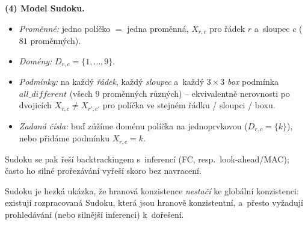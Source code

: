 \begin{priklad}
\textbf{(4) Model Sudoku.}
\begin{itemize}
  \item \emph{Proměnné:} jedno políčko $=$ jedna proměnná, $X_{r,c}$ pro řádek $r$ a~sloupec $c$ ($81$ proměnných).
  \item \emph{Domény:} $D_{r,c}=\{1,\dots,9\}$.
  \item \emph{Podmínky:} na každý \emph{řádek}, každý \emph{sloupec} a~každý $3\times 3$ \emph{box} podmínka $\mathit{all\_different}$ (všech $9$ proměnných různých) -- ekvivalentně nerovnosti po dvojicích $X_{r,c}\neq X_{r',c'}$ pro políčka ve stejném řádku / sloupci / boxu.
  \item \emph{Zadaná čísla:} buď zúžíme doménu políčka na jednoprvkovou ($D_{r,c}=\{k\}$), nebo přidáme podmínku $X_{r,c}=k$.
\end{itemize}
Sudoku se pak řeší backtrackingem s~inferencí (FC, resp.\ look-ahead/MAC); často ho silné prořezávání vyřeší skoro bez navracení.
\begin{poznamka}
Sudoku je hezká ukázka, že hranová konzistence \emph{nestačí} ke globální konzistenci: existují rozpracovaná Sudoku, která jsou hranově konzistentní, a~přesto vyžadují prohledávání (nebo silnější inferenci) k~dořešení.
\end{poznamka}
\end{priklad}

